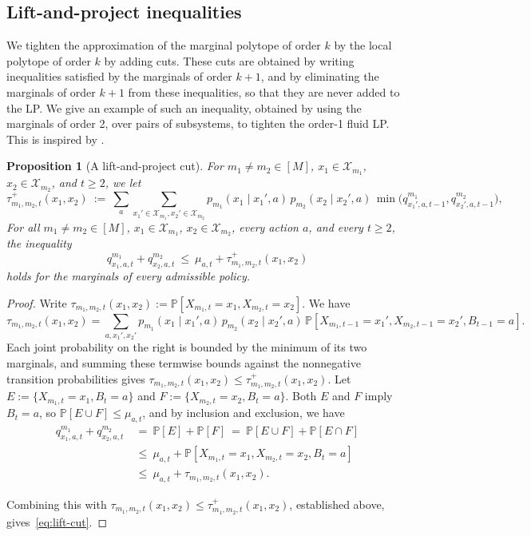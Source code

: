 \documentclass{article}
\newtheorem{proposition}{Proposition}
\begin{document}
\subsection{Lift-and-project inequalities}
\label{sec:lift-and-project}

We tighten the approximation of the marginal polytope of order $k$ by the local polytope of order $k$ by adding cuts. These cuts are obtained by writing inequalities satisfied by the marginals of order
$k+1$, and by eliminating the marginals of order $k+1$ from these inequalities, so that they are never added to the
LP. We give an example of such an inequality, obtained by using the marginals of order 2, over pairs of subsystems, to
tighten the order-1 fluid LP. This is inspired by \cite[Example~8.7]{wainwright2008graphical}.

\begin{proposition}[A lift-and-project cut]
\label{prop:lift-cut} For $m_1 \neq m_2 \in [M]$, $x_1 \in \mathcal X_{m_1}$, $x_2 \in \mathcal X_{m_2}$, and $t \geq 2$, we let
\[
\tau^+_{m_1,m_2,t}(x_1,x_2) \ :=\ \sum_{a} \sum_{x_1' \in \mathcal X_{m_1}, x_2' \in \mathcal X_{m_2}} p_{m_1}(x_1 \mid x_1',a)\, p_{m_2}(x_2 \mid x_2',a)\, \min\big(q^{m_1}_{x_1',a,t-1}, q^{m_2}_{x_2',a,t-1}\big),
\]
For all $m_1 \neq m_2 \in [M]$, $x_1 \in \mathcal X_{m_1}$, $x_2 \in \mathcal X_{m_2}$, every action $a$, and every $t \geq 2$, the inequality
\begin{equation}
q^{m_1}_{x_1,a,t} + q^{m_2}_{x_2,a,t} \ \leq\ \mu_{a,t} + \tau^+_{m_1,m_2,t}(x_1,x_2) \tag{C}
\label{eq:lift-cut}
\end{equation}
holds for the marginals of every admissible policy.
\end{proposition}

\begin{proof}
Write $\tau_{m_1,m_2,t}(x_1,x_2) := \mathbb P[X_{m_1,t}=x_1,X_{m_2,t}=x_2]$.
We have
\[
\tau_{m_1,m_2,t}(x_1,x_2) = \sum_{a,x_1',x_2'} p_{m_1}(x_1\mid x_1',a)\, p_{m_2}(x_2\mid x_2',a)\, \mathbb P[X_{m_1,t-1}=x_1', X_{m_2,t-1}=x_2', B_{t-1}=a].
\]
Each joint probability on the right is bounded by the minimum of its two marginals, and summing
these termwise bounds against the nonnegative transition probabilities gives $\tau_{m_1,m_2,t}(x_1,x_2) \leq \tau^+_{m_1,m_2,t}(x_1,x_2)$. Let $E := \{X_{m_1,t}=x_1, B_t=a\}$ and $F := \{X_{m_2,t}=x_2, B_t=a\}$. Both $E$ and $F$ imply $B_t=a$, so $\mathbb P[E \cup F] \leq \mu_{a,t}$, and by inclusion and exclusion, we have
\begin{align*}
q^{m_1}_{x_1,a,t} + q^{m_2}_{x_2,a,t} \ &=\ \mathbb P[E] + \mathbb P[F] \ =\ \mathbb P[E \cup F] + \mathbb P[E \cap F] \\
&\leq\ \mu_{a,t} + \mathbb P[X_{m_1,t}=x_1,X_{m_2,t}=x_2,B_t=a] \\
&\leq\ \mu_{a,t} + \tau_{m_1,m_2,t}(x_1,x_2).
\end{align*}

Combining this with $\tau_{m_1,m_2,t}(x_1,x_2) \leq \tau^+_{m_1,m_2,t}(x_1,x_2)$, established above, gives~\eqref{eq:lift-cut}.
\end{proof}
\end{document}
